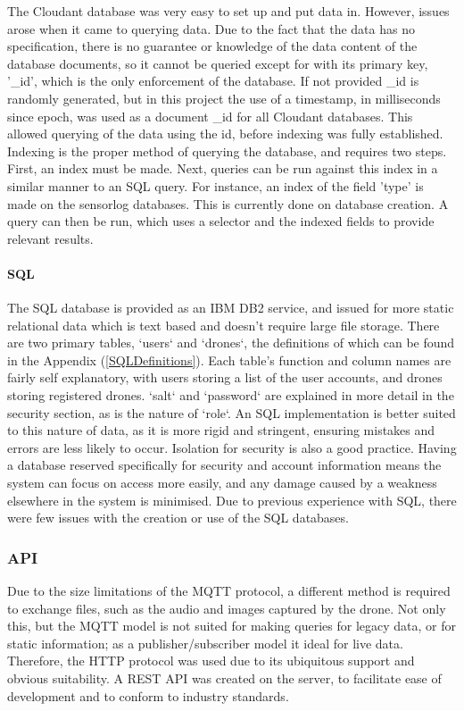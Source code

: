 \documentclass{article}
\begin{document}
The Cloudant database was very easy to set up and put data in. However, issues arose when it came to querying data. Due to the fact that the data has no specification, there is no guarantee or knowledge of the data content of the database documents, so it cannot be queried except for with its primary key, '\_id', which is the only enforcement of the database. If not provided \_id is randomly generated, but in this project the use of a timestamp, in milliseconds since epoch, was used as a document \_id for all Cloudant databases. This allowed querying of the data using the id, before indexing was fully established. Indexing is the proper method of querying the database, and requires two steps. First, an index must be made. Next, queries can be run against this index in a similar manner to an SQL query. For instance, an index of the field 'type' is made on the sensorlog databases. This is currently done on database creation. A query can then be run, which uses a selector and the indexed fields to provide relevant results.

\paragraph{SQL} \label{SQL}
The SQL database is provided as an IBM DB2 service, and issued for more static relational data which is text based and doesn't require large file storage. There are two primary tables, `users` and `drones`, the definitions of which can be found in the Appendix (\ref{SQLDefinitions}). Each table's function and column names are fairly self explanatory, with users storing a list of the user accounts, and drones storing registered drones. `salt` and `password` are explained in more detail in the security section, as is the nature of `role`. An SQL implementation is better suited to this nature of data, as it is more rigid and stringent, ensuring mistakes and errors are less likely to occur. Isolation for security is also a good practice. Having a database reserved specifically for security and account information means the system can focus on access more easily, and any damage caused by a weakness elsewhere in the system is minimised. Due to previous experience with SQL, there were few issues with the creation or use of the SQL databases. 

\subsubsection{API} \label{API}
Due to the size limitations of the MQTT protocol, a different method is required to exchange files, such as the audio and images captured by the drone. Not only this, but the MQTT model is not suited for making queries for legacy data, or for static information; as a publisher/subscriber model it ideal for live data. Therefore, the HTTP protocol was used due to its ubiquitous support and obvious suitability. A REST API was created on the server, to facilitate ease of development and to conform to industry standards. 
\end{document}
